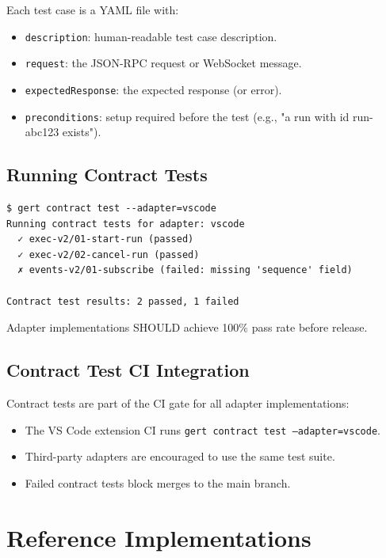 Each test case is a YAML file with:

\begin{itemize}
  \item \texttt{description}: human-readable test case description.
  \item \texttt{request}: the JSON-RPC request or WebSocket message.
  \item \texttt{expectedResponse}: the expected response (or error).
  \item \texttt{preconditions}: setup required before the test (e.g., "a run
        with id run-abc123 exists").
\end{itemize}

\subsection{Running Contract Tests}

\begin{verbatim}
$ gert contract test --adapter=vscode
Running contract tests for adapter: vscode
  ✓ exec-v2/01-start-run (passed)
  ✓ exec-v2/02-cancel-run (passed)
  ✗ events-v2/01-subscribe (failed: missing 'sequence' field)

Contract test results: 2 passed, 1 failed
\end{verbatim}

Adapter implementations SHOULD achieve 100\% pass rate before release.

\subsection{Contract Test CI Integration}

Contract tests are part of the CI gate for all adapter implementations:

\begin{itemize}
  \item The VS Code extension CI runs \texttt{gert contract test
        --adapter=vscode}.
  \item Third-party adapters are encouraged to use the same test suite.
  \item Failed contract tests block merges to the main branch.
\end{itemize}

\section{Reference Implementations}
\label{sec:reference-implementations}

